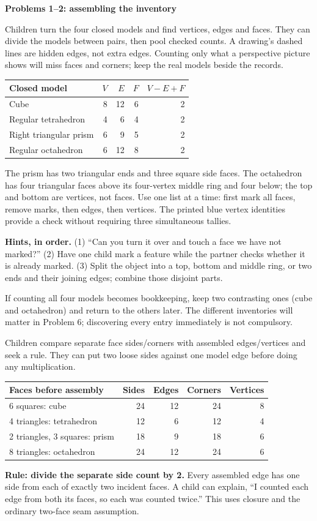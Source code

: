 \documentclass[11pt,letterpaper]{article}
\newcommand{\titleline}[1]{\par{\Large\bfseries #1}\par\vspace{4pt}}
\newcommand{\sub}[1]{\par\vspace{3pt}{\bfseries #1}\par}
\newcommand{\hints}[3]{\textbf{Hints, in order.} (1) #1 (2) #2 (3) #3\par}
\begin{document}
\newpage
\titleline{Problems 1--2: assembling the inventory}
\sub{Problem 1 / student p.1 / concrete core}
Children turn the four closed models and find vertices, edges and faces. They can divide the models between pairs, then pool checked counts. A drawing's dashed lines are hidden edges, not extra edges. Counting only what a perspective picture shows will miss faces and corners; keep the real models beside the records.

\begin{center}
\begin{tabular}{|l|r|r|r|r|}\hline
Closed model & $V$ & $E$ & $F$ & $V-E+F$\\\hline
Cube & 8 & 12 & 6 & 2\\
Regular tetrahedron & 4 & 6 & 4 & 2\\
Right triangular prism & 6 & 9 & 5 & 2\\
Regular octahedron & 6 & 12 & 8 & 2\\\hline
\end{tabular}
\end{center}
The prism has two triangular ends and three square side faces. The octahedron has four triangular faces above its four-vertex middle ring and four below; the top and bottom are vertices, not faces. Use one list at a time: first mark all faces, remove marks, then edges, then vertices. The printed blue vertex identities provide a check without requiring three simultaneous tallies.

\hints{``Can you turn it over and touch a face we have not marked?''}{Have one child mark a feature while the partner checks whether it is already marked.}{Split the object into a top, bottom and middle ring, or two ends and their joining edges; combine those disjoint parts.}
If counting all four models becomes bookkeeping, keep two contrasting ones (cube and octahedron) and return to the others later. The different inventories will matter in Problem 6; discovering every entry immediately is not compulsory.

\sub{Problem 2 / student p.2 / concrete core}
Children compare separate face sides/corners with assembled edges/vertices and seek a rule. They can put two loose sides against one model edge before doing any multiplication.

\begin{center}
\begin{tabular}{|l|r|r|r|r|}\hline
Faces before assembly & Sides & Edges & Corners & Vertices\\\hline
6 squares: cube & 24 & 12 & 24 & 8\\
4 triangles: tetrahedron & 12 & 6 & 12 & 4\\
2 triangles, 3 squares: prism & 18 & 9 & 18 & 6\\
8 triangles: octahedron & 24 & 12 & 24 & 6\\\hline
\end{tabular}
\end{center}
\textbf{Rule: divide the separate side count by 2.} Every assembled edge has one side from each of exactly two incident faces. A child can explain, ``I counted each edge from both its faces, so each was counted twice.'' This uses closure and the ordinary two-face seam assumption.
\end{document}
